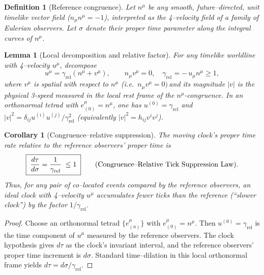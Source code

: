 \documentclass[12pt]{article}
\newtheorem{definition}{Definition}
\theoremstyle{plain}
\newtheorem{lemma}{Lemma}
\newtheorem{corollary}{Corollary}
\begin{document}
\begin{definition}[Reference congruence]
Let $n^\mu$ be any smooth, future–directed, unit timelike vector field ($n_\mu n^\mu=-1$),
interpreted as the 4–velocity field of a family of Eulerian observers. Let $\sigma$ denote
their proper time parameter along the integral curves of $n^\mu$.
\end{definition}

\begin{lemma}[Local decomposition and relative factor]
For any timelike worldline with 4–velocity $u^\mu$, decompose
\[
u^\mu=\gamma_{\mathrm{rel}}\!\left(n^\mu+v^\mu\right), \qquad
n_\mu v^\mu=0,\quad \gamma_{\mathrm{rel}}=-\,u_\mu n^\mu \ge 1,
\]
where $v^\mu$ is spatial with respect to $n^\mu$ (i.e.\ $n_\mu v^\mu=0) \,$and its magnitude
$|v|$ is the \emph{physical 3-speed} measured in the local rest frame of the $n^\mu$-congruence.
In an orthonormal tetrad with $e_{(0)}^\mu=n^\mu$, one has $u^{(0)}=\gamma_{\mathrm{rel}}$ and
$|v|^2=\delta_{ij}u^{(i)}u^{(j)}/\gamma_{\mathrm{rel}}^2$ (equivalently $|v|^2=h_{ij}v^i v^j$).
\end{lemma}

\begin{corollary}[Congruence–relative suppression]
\label{cor:SuppNoT}
The moving clock’s proper time rate relative to the reference observers’ proper time is
\begin{equation}
\boxed{\;\frac{d\tau}{d\sigma}=\frac{1}{\gamma_{\mathrm{rel}}}\;\le 1\;}
\qquad\text{\normalfont (Congruence–Relative Tick Suppression Law).}
\label{eq:CRTS}
\end{equation}
Thus, for any pair of co–located events compared by the reference observers,
an ideal clock with 4–velocity $u^\mu$ accumulates fewer ticks than the reference
(“slower clock”) by the factor $1/\gamma_{\mathrm{rel}}$.
\end{corollary}

\begin{proof}
Choose an orthonormal tetrad $\{e_{(a)}^\mu\}$ with $e_{(0)}^\mu=n^\mu$. Then
$u^{(0)}=\gamma_{\mathrm{rel}}$ is the time component of $u^\mu$ measured by the
reference observers. The clock hypothesis gives $d\tau$ as the clock’s invariant interval,
and the reference observers’ proper time increment is $d\sigma$. Standard time–dilation
in this local orthonormal frame yields $d\tau = d\sigma/\gamma_{\mathrm{rel}}$.
\end{proof}
\end{document}
